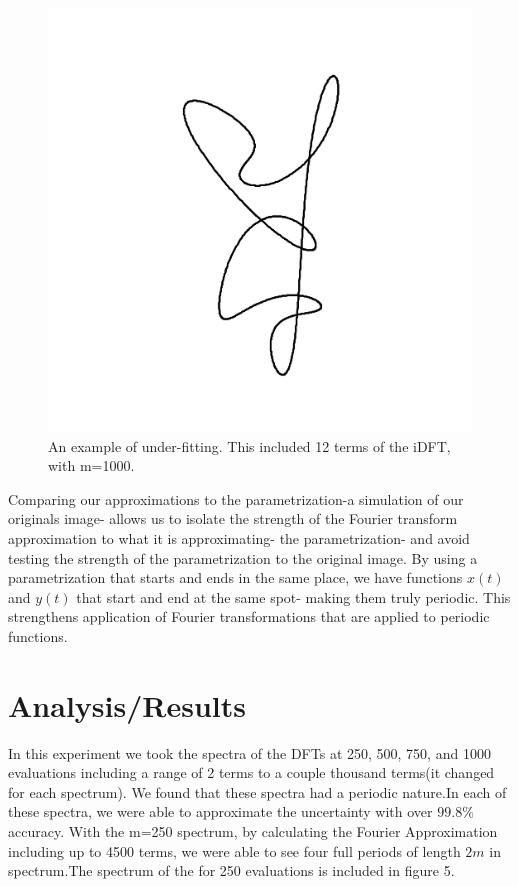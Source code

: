 \documentclass[psamsfonts]{amsart}
\theoremstyle{definition}
\theoremstyle{remark}
\numberwithin{equation}{section}
\begin{document}
\begin{figure}[h!]
	\centering
	\includegraphics[scale=.2]{girl12.png}
	\caption{An example of under-fitting. This included 12 terms of the iDFT, with m=1000.}
\end{figure}
Comparing our approximations to the parametrization-a simulation of our originals image- allows us to isolate the strength of the Fourier transform approximation to what it is approximating- the parametrization- and avoid testing the strength of the parametrization to the original image.
By using a parametrization that starts and ends in the same place, we have functions $x(t)$ and $y(t)$ that start and end at the same spot- making them truly periodic. This strengthens application of Fourier transformations that are applied to periodic functions. 

\section{Analysis/Results}
In this experiment we took the spectra of the DFTs at 250, 500, 750, and 1000 evaluations including a range of 2 terms to a couple thousand terms(it changed for each spectrum). We found that these spectra had a periodic nature.In each of these spectra, we were able to approximate the uncertainty with over $99.8\%$ accuracy. With the m=250 spectrum, by calculating the Fourier Approximation including up to 4500 terms, we were able to see four full periods of length $2m$ in spectrum.The spectrum of the for 250 evaluations is included in figure 5.
\end{document}
